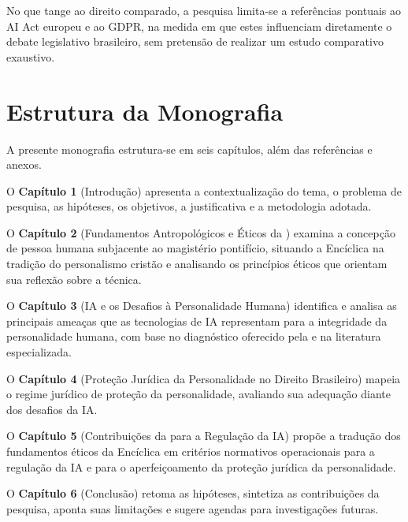 No que tange ao direito comparado, a pesquisa limita-se a referências pontuais ao AI Act europeu e ao GDPR, na medida em que estes influenciam diretamente o debate legislativo brasileiro, sem pretensão de realizar um estudo comparativo exaustivo.

\section{Estrutura da Monografia}
\label{sec:estrutura}

A presente monografia estrutura-se em seis capítulos, além das referências e anexos.

O \textbf{Capítulo 1} (Introdução) apresenta a contextualização do tema, o problema de pesquisa, as hipóteses, os objetivos, a justificativa e a metodologia adotada.

O \textbf{Capítulo 2} (Fundamentos Antropológicos e Éticos da \MH{}) examina a concepção de pessoa humana subjacente ao magistério pontifício, situando a Encíclica na tradição do personalismo cristão e analisando os princípios éticos que orientam sua reflexão sobre a técnica.

O \textbf{Capítulo 3} (IA e os Desafios à Personalidade Humana) identifica e analisa as principais ameaças que as tecnologias de IA representam para a integridade da personalidade humana, com base no diagnóstico oferecido pela \MH{} e na literatura especializada.

O \textbf{Capítulo 4} (Proteção Jurídica da Personalidade no Direito Brasileiro) mapeia o regime jurídico de proteção da personalidade, avaliando sua adequação diante dos desafios da IA.

O \textbf{Capítulo 5} (Contribuições da \MH{} para a Regulação da IA) propõe a tradução dos fundamentos éticos da Encíclica em critérios normativos operacionais para a regulação da IA e para o aperfeiçoamento da proteção jurídica da personalidade.

O \textbf{Capítulo 6} (Conclusão) retoma as hipóteses, sintetiza as contribuições da pesquisa, aponta suas limitações e sugere agendas para investigações futuras.
